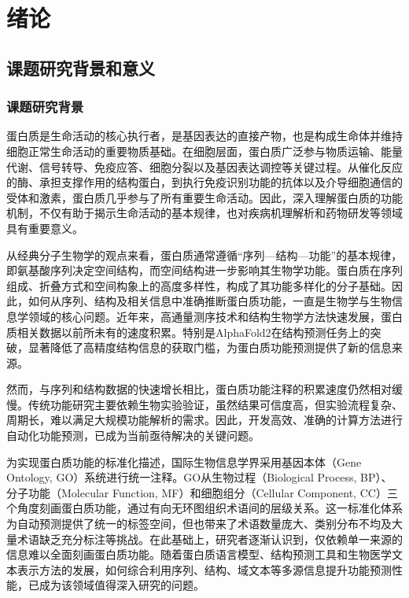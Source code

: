 
\chapter{绪论}

\section{课题研究背景和意义}

\subsection{课题研究背景}

蛋白质是生命活动的核心执行者，是基因表达的直接产物，也是构成生命体并维持细胞正常生命活动的重要物质基础\cite{eisenberg2000protein}。在细胞层面，蛋白质广泛参与物质运输、能量代谢、信号转导、免疫应答、细胞分裂以及基因表达调控等关键过程。从催化反应的酶、承担支撑作用的结构蛋白，到执行免疫识别功能的抗体以及介导细胞通信的受体和激素，蛋白质几乎参与了所有重要生命活动。因此，深入理解蛋白质的功能机制，不仅有助于揭示生命活动的基本规律，也对疾病机理解析和药物研发等领域具有重要意义。

从经典分子生物学的观点来看，蛋白质通常遵循“序列—结构—功能”的基本规律，即氨基酸序列决定空间结构，而空间结构进一步影响其生物学功能。蛋白质在序列组成、折叠方式和空间构象上的高度多样性，构成了其功能多样化的分子基础。因此，如何从序列、结构及相关信息中准确推断蛋白质功能，一直是生物学与生物信息学领域的核心问题。近年来，高通量测序技术和结构生物学方法快速发展，蛋白质相关数据以前所未有的速度积累。特别是AlphaFold2\cite{jumper2021highly}在结构预测任务上的突破，显著降低了高精度结构信息的获取门槛，为蛋白质功能预测提供了新的信息来源。

然而，与序列和结构数据的快速增长相比，蛋白质功能注释的积累速度仍然相对缓慢\cite{friedberg2006automated}。传统功能研究主要依赖生物实验验证，虽然结果可信度高，但实验流程复杂、周期长，难以满足大规模功能解析的需求\cite{lin2024comprehensive}。因此，开发高效、准确的计算方法进行自动化功能预测，已成为当前亟待解决的关键问题。

为实现蛋白质功能的标准化描述，国际生物信息学界采用基因本体（Gene Ontology, GO）系统进行统一注释\cite{ashburner2000gene}。GO从生物过程（Biological Process, BP）、分子功能（Molecular Function, MF）和细胞组分（Cellular Component, CC）三个角度刻画蛋白质功能，通过有向无环图组织术语间的层级关系。这一标准化体系为自动预测提供了统一的标签空间，但也带来了术语数量庞大、类别分布不均及大量术语缺乏充分标注等挑战。在此基础上，研究者逐渐认识到，仅依赖单一来源的信息难以全面刻画蛋白质功能。随着蛋白质语言模型、结构预测工具和生物医学文本表示方法的发展，如何综合利用序列、结构、域文本等多源信息提升功能预测性能，已成为该领域值得深入研究的问题。

